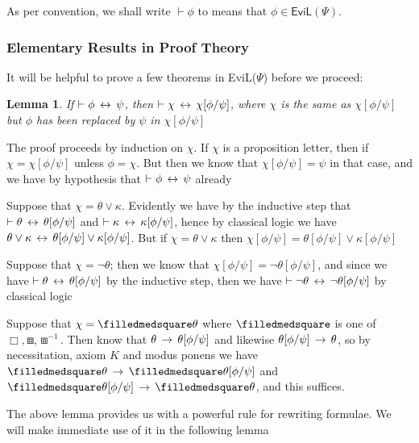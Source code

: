 \documentclass[11pt]{article}
\newtheorem{lemma}[theorem]{Lemma}
\newcommand{\BB}{\boxbox}
\newcommand{\BlackBox}{\filledmedsquare}
\begin{document}
As per convention, we shall write $\vdash \phi$ to means that $\phi \in \mathsf{EviL}(\Psi)$.

\subsubsection{Elementary Results in Proof Theory}
It will be helpful to prove a few theorems in \textsf{EviL}($\Psi$) before we proceed:

\begin{lemma}
	If $\vdash \phi \,\leftrightarrow\, \psi$, then $\vdash \chi \,\leftrightarrow\, \chi[\phi/\psi]$, where $\chi$ is the same as $\chi[\phi/\psi]$ but $\phi$ has been replaced by $\psi$ in $\chi[\phi/\psi]$
\end{lemma}
\begin{peano}
	\item The proof proceeds by induction on $\chi$.  If $\chi$ is a proposition letter, then if $\chi = \chi[\phi/\psi]$ unless $\phi = \chi$.  But then we know that $\chi[\phi/\psi] = \psi$ in that case, and we have by hypothesis that $\vdash \phi \,\leftrightarrow\, \psi$ already
	\item Suppose that $\chi = \theta \vee \kappa$.  Evidently we have by the inductive step that $\vdash \theta \,\leftrightarrow\, \theta[\phi/\psi]$ and $\vdash \kappa \,\leftrightarrow\, \kappa[\phi/\psi]$, hence by classical logic we have $\theta \vee \kappa \,\leftrightarrow\, \theta[\phi/\psi] \vee \kappa[\phi/\psi]$.  But if $\chi = \theta \vee \kappa$ then $\chi[\phi/\psi] = \theta[\phi/\psi] \vee \kappa[\phi/\psi]$
	\item Suppose that $\chi = \neg \theta$; then we know that $\chi[\phi/\psi] = \neg \theta[\phi/\psi]$, and since we have $\vdash \theta \,\leftrightarrow\, \theta[\phi/\psi]$ by the inductive step, then we have $\vdash \neg \theta \,\leftrightarrow\, \neg \theta[\phi/\psi]$ by classical logic
	\item Suppose that $\chi = \BlackBox \theta$ where $\BlackBox$ is one of $\Box, \BB, \BB^{-1}$.  Then know that $\theta \,\rightarrow\, \theta[\phi/\psi]$ and likewise $\theta[\phi/\psi] \,\rightarrow\, \theta$, so by necessitation, axiom $K$ and modus ponens we have $\BlackBox\theta \IMPL \BlackBox\theta[\phi/\psi]$ and $\BlackBox\theta[\phi/\psi] \IMPL \BlackBox\theta$, and this suffices.
\end{peano}

The above lemma provides us with a powerful rule for rewriting formulae.  We will make immediate use of it in the following lemma
\end{document}
